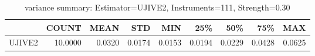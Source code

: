 \begin{table}[ht]
\centering
\caption{variance summary: Estimator=UJIVE2, Instruments=111, Strength=0.30}
\begin{tabular}{lrrrrrrrr}
\toprule
 & COUNT & MEAN & STD & MIN & 25\% & 50\% & 75\% & MAX \\
\midrule
UJIVE2 & 10.0000 & 0.0320 & 0.0174 & 0.0153 & 0.0194 & 0.0229 & 0.0428 & 0.0625 \\
\bottomrule
\end{tabular}
\end{table}
